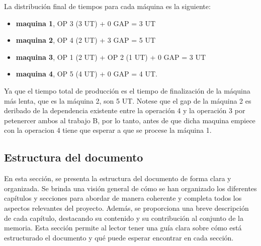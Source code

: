 La distribución final de tiempos para cada máquina es la siguiente: 
\begin{itemize}
    \item \textbf{maquina 1}, OP 3 (3 UT) + 0 GAP = 3 UT 
    \item \textbf{maquina 2}, OP 4 (2 UT) + 3 GAP = 5 UT 
    \item \textbf{maquina 3}, OP 1 (2 UT) + OP 2 (1 UT) + 0 GAP = 3 UT 
    \item \textbf{maquina 4}, OP 5 (4 UT) + 0 GAP = 4 UT. 
\end{itemize}

Ya que el tiempo total de producción es el tiempo de finalización de la máquina más lenta, 
que es la máquina 2, son 5 UT. Notese que el gap de la máquina 2 es deribado de la dependencia
existente entre la operación 4 y la operación 3 por petenercer ambos al trabajo B, 
por lo tanto, antes de que dicha maquina empiece con la operacion 4 tiene que esperar 
a que se procese la máquina 1.

\subsection{Estructura del documento}
En esta sección, se presenta la estructura del documento de forma clara y organizada. Se 
brinda una visión general de cómo se han organizado los diferentes capítulos y secciones 
para abordar de manera coherente y completa todos los aspectos relevantes del proyecto. 
Además, se proporciona una breve descripción de cada capítulo, destacando su contenido 
y su contribución al conjunto de la memoria. Esta sección permite al lector tener una 
guía clara sobre cómo está estructurado el documento y qué puede esperar encontrar en cada 
sección.

